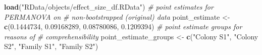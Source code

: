 \documentclass[]{article}
\newenvironment{Shaded}{\begin{snugshade}}{\end{snugshade}}
\newcommand{\KeywordTok}[1]{\textcolor[rgb]{0.13,0.29,0.53}{\textbf{#1}}}
\newcommand{\FloatTok}[1]{\textcolor[rgb]{0.00,0.00,0.81}{#1}}
\newcommand{\StringTok}[1]{\textcolor[rgb]{0.31,0.60,0.02}{#1}}
\newcommand{\CommentTok}[1]{\textcolor[rgb]{0.56,0.35,0.01}{\textit{#1}}}
\newcommand{\NormalTok}[1]{#1}
\begin{document}
\begin{Shaded}
\begin{Highlighting}[]
\KeywordTok{load}\NormalTok{(}\StringTok{"RData/objects/effect_size_df.RData"}\NormalTok{)}
\CommentTok{# point estimates for PERMANOVA on}
\CommentTok{# non-bootstrapped (original) data}
\NormalTok{point_estimate <-}\StringTok{ }\KeywordTok{c}\NormalTok{(}\FloatTok{0.1444734}\NormalTok{, }\FloatTok{0.09168289}\NormalTok{, }
    \FloatTok{0.08780086}\NormalTok{, }\FloatTok{0.1209394}\NormalTok{)}
\CommentTok{# point estimate groups for reasons of}
\CommentTok{# comprehensibility}
\NormalTok{point_estimate_groups <-}\StringTok{ }\KeywordTok{c}\NormalTok{(}\StringTok{"Colony S1"}\NormalTok{, }\StringTok{"Colony S2"}\NormalTok{, }
    \StringTok{"Family S1"}\NormalTok{, }\StringTok{"Family S2"}\NormalTok{)}


\end{Highlighting}
\end{Shaded}
\end{document}
